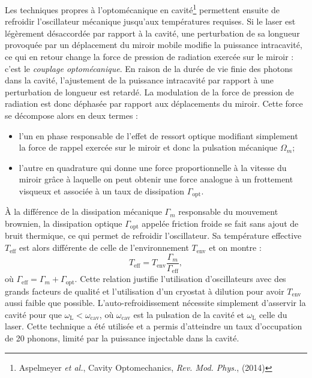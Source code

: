 \documentclass[12pt,a4paper]{article}
\begin{document}
Les techniques propres à l'optomécanique en cavité\footnote{Aspelmeyer \textit{et al.}, Cavity Optomechanics, \textit{Rev. Mod. Phys.}, (2014)} permettent ensuite de refroidir l'oscillateur mécanique jusqu'aux températures requises.
Si le laser est légèrement désaccordée par rapport à la cavité, une perturbation de sa longueur provoquée par un déplacement du miroir mobile modifie la puissance intracavité, ce qui en retour change la force de pression de radiation exercée sur le miroir : c'est le \textit{couplage optomécanique}. 
En raison de la durée de vie finie des photons dans la cavité, l'ajustement de la puissance intracavité par rapport à une perturbation de longueur est retardé.
La modulation de la force de pression de radiation est donc déphasée par rapport aux déplacements du miroir.
Cette force se décompose alors en deux termes :
\begin{itemize}
\item l'un en phase responsable de l'effet de ressort optique modifiant simplement la force de rappel exercée sur le miroir et donc la pulsation mécanique $\Omega_m$;
\item l'autre en quadrature qui donne une force proportionnelle à la vitesse du miroir grâce à laquelle on peut obtenir une force analogue à un frottement visqueux et associée à un taux de dissipation $\Gamma_\mathrm{opt}$.
\end{itemize}
À la différence de la dissipation mécanique $\Gamma_m$ responsable du mouvement brownien, la dissipation optique $\Gamma_\mathrm{opt}$ appelée friction froide se fait sans ajout de bruit thermique, ce qui permet de refroidir l'oscillateur.
Sa température effective $T_\mathrm{eff}$ est alors différente de celle de l'environnement $T_\mathrm{env}$ et on montre :
\begin{equation}
T_\mathrm{eff} = T_\mathrm{env} \frac{\Gamma_m}{\Gamma_\mathrm{eff}},
\end{equation}
où $\Gamma_\mathrm{eff} = \Gamma_m+\Gamma_\mathrm{opt}$.
Cette relation justifie l'utilisation d'oscillateurs avec des grands facteurs de qualité et l'utilisation d'un cryostat à dilution pour avoir $T_\mathrm{env}$ aussi faible que possible.
L'auto-refroidissement nécessite \og simplement \fg{} d'asservir la cavité pour que $\omega_\mathrm{L} < \omega_\mathrm{cav}$, où $\omega_\mathrm{cav}$ est la pulsation de la cavité et $\omega_\mathrm{L}$ celle du laser.
Cette technique a été utilisée et a permis d'atteindre un taux d'occupation de 20 phonons, limité par la puissance injectable dans la cavité.
\end{document}
